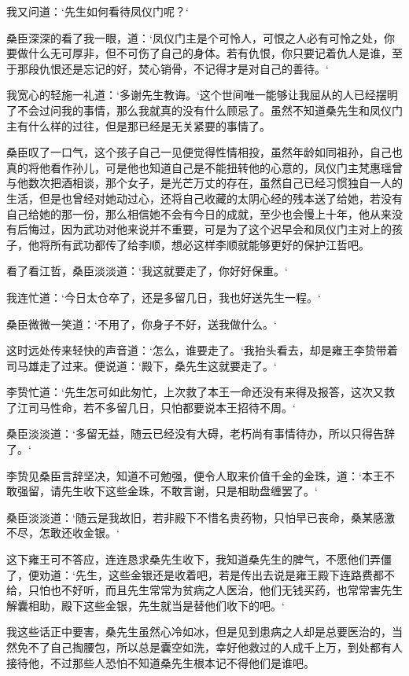 我又问道：‘先生如何看待凤仪门呢？‘

桑臣深深的看了我一眼，道：‘凤仪门主是个可怜人，可恨之人必有可怜之处，你要做什么无可厚非，但不可伤了自己的身体。若有仇恨，你只要记着仇人是谁，至于那段仇恨还是忘记的好，焚心销骨，不记得才是对自己的善待。‘

我宽心的轻施一礼道：‘多谢先生教诲。‘这个世间唯一能够让我屈从的人已经摆明了不会过问我的事情，那么我就真的没有什么顾忌了。虽然不知道桑先生和凤仪门主有什么样的过往，但是那已经是无关紧要的事情了。

桑臣叹了一口气，这个孩子自己一见便觉得性情相投，虽然年龄如同祖孙，自己也真的将他看作孙儿，可是他也知道自己是不能扭转他的心意的，凤仪门主梵惠瑶曾与他数次把酒相谈，那个女子，是光芒万丈的存在，虽然自己已经习惯独自一人的生活，但是也曾经对她动过心，还将自己收藏的太阴心经的残本送了给她，若没有自己给她的那一份，那么相信她不会有今日的成就，至少也会慢上十年，他从来没有后悔过，因为武功对他来说并不重要，可是为了这个迟早会和凤仪门主对上的孩子，他将所有武功都传了给李顺，想必这样李顺就能够更好的保护江哲吧。

看了看江哲，桑臣淡淡道：‘我这就要走了，你好好保重。‘

我连忙道：‘今日太仓卒了，还是多留几日，我也好送先生一程。‘

桑臣微微一笑道：‘不用了，你身子不好，送我做什么。‘

这时远处传来轻快的声音道：‘怎么，谁要走了。‘我抬头看去，却是雍王李贽带着司马雄走了过来。便说道：‘殿下，桑先生这就要走了。‘

李贽忙道：‘先生怎可如此匆忙，上次救了本王一命还没有来得及报答，这次又救了江司马性命，若不多留几日，只怕都要说本王招待不周。‘

桑臣淡淡道：‘多留无益，随云已经没有大碍，老朽尚有事情待办，所以只得告辞了。‘

李贽见桑臣言辞坚决，知道不可勉强，便令人取来价值千金的金珠，道：‘本王不敢强留，请先生收下这些金珠，不敢言谢，只是相助盘缠罢了。‘

桑臣淡淡道：‘随云是我故旧，若非殿下不惜名贵药物，只怕早已丧命，桑某感激不尽，怎敢还收金银。‘

这下雍王可不答应，连连恳求桑先生收下，我知道桑先生的脾气，不愿他们弄僵了，便劝道：‘先生，这些金银还是收着吧，若是传出去说是雍王殿下连路费都不给，只怕也不好听，而且先生常常为贫病之人医治，他们无钱买药，也常常害先生解囊相助，殿下这些金银，先生就当是替他们收下的吧。‘

我这些话正中要害，桑先生虽然心冷如冰，但是见到患病之人却是总要医治的，当然免不了自己掏腰包，所以总是囊空如洗，幸好他救过的人成千上万，到处都有人接待他，不过那些人恐怕不知道桑先生根本记不得他们是谁吧。

